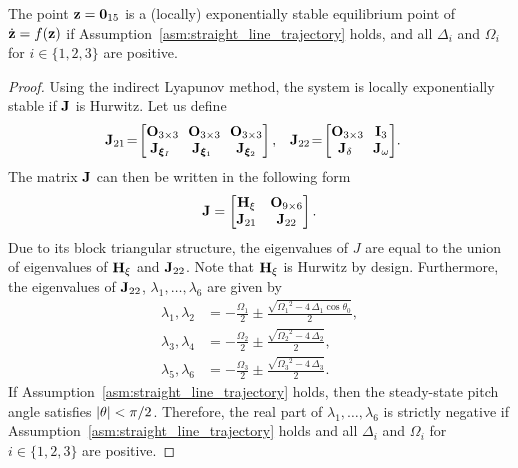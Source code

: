 \begin{prop}
    The point $\mathbf{z} = \mathbf{0}_{15}$ is a (locally) exponentially stable equilibrium point of $\dot{\mathbf{z}} = f(\mathbf{z})$ if Assumption~\ref{asm:straight_line_trajectory} holds, and all $\Delta_i$ and $\Omega_i$ for $i \in \{1,2,3\}$ are positive.
    \label{prop:straight_line_trajectory}
\end{prop}
\begin{proof}
    Using the indirect Lyapunov method, the system is locally exponentially stable if $\mathbf{J}$ is Hurwitz.
    Let us define
    \begin{align}
        \mat{J}_{21}\! &= \!\begin{bmatrix}
            \mat{O}_{3 \times 3}\!\! & \mat{O}_{3 \times 3}\!\! & \mat{O}_{3 \times 3} \\
            \mat{J}_{\bs{\xi}_I} & \mat{J}_{\bs{\xi}_1} & \mat{J}_{\bs{\xi}_2}
        \end{bmatrix}, &
        \mat{J}_{22}\! &= \!\begin{bmatrix}
            \mat{O}_{3 \times 3}\!\! & \mat{I}_{3} \\
            \mat{J}_{\delta} & \mat{J}_{\omega}
        \end{bmatrix}\!.
    \end{align}
    The matrix $\mathbf{J}$ can then be written in the following form
    \begin{equation}
        \mathbf{J} = \begin{bmatrix}
            \mathbf{H}_{\xi} & \mathbf{O}_{9 \times 6} \\
            \mathbf{J}_{21} & \mathbf{J}_{22}
        \end{bmatrix}.
    \end{equation}
    Due to its block triangular structure, the eigenvalues of $J$ are equal to the union of eigenvalues of $\mathbf{H}_{\xi}$ and $\mathbf{J}_{22}$.
    Note that $\mathbf{H}_{\xi}$ is Hurwitz by design.
    Furthermore, the eigenvalues of $\mathbf{J}_{22}$, $\lambda_1, \ldots, \lambda_6$ are given by
    \begin{subequations}
        \begin{align}
            \lambda_1, \lambda_2 &= -\frac{\Omega_{1}}{2} \pm \frac{\sqrt{{\Omega_{1}}^2-4\,\Delta_{1}\cos\theta_0}}{2}, \\
            \lambda_3, \lambda_4 &= -\frac{\Omega_{2}}{2} \pm \frac{\sqrt{{\Omega_{2}}^2-4\,\Delta_{2}}}{2}, \\
            \lambda_5, \lambda_6 &= -\frac{\Omega_{3}}{2} \pm \frac{\sqrt{{\Omega_{3}}^2-4\,\Delta_{3}}}{2}.
        \end{align}
    \end{subequations}
    If Assumption~\ref{asm:straight_line_trajectory} holds, then the steady-state pitch angle satisfies $\left|\theta\right| < \pi/2$.
    Therefore, the real part of $\lambda_1, \ldots, \lambda_6$ is strictly negative if Assumption~\ref{asm:straight_line_trajectory} holds and all $\Delta_i$ and $\Omega_i$ for $i \in \{1,2,3\}$ are positive.
\end{proof}

